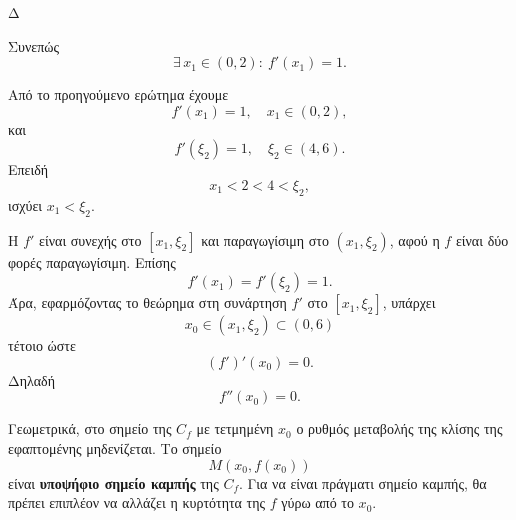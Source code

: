 \begin{thema}{Δ}
\begin{erwthma}
Συνεπώς
\[
{\exists\,x_1\in(0,2):\ f'(x_1)=1}.
\]

\item Από το προηγούμενο ερώτημα έχουμε
\[
f'(x_1)=1,\quad x_1\in(0,2),
\]
και
\[
f'(\xi_2)=1,\quad \xi_2\in(4,6).
\]
Επειδή
\[
x_1<2<4<\xi_2,
\]
ισχύει $x_1<\xi_2$.

Η $f'$ είναι συνεχής στο $[x_1,\xi_2]$ και παραγωγίσιμη στο
$(x_1,\xi_2)$, αφού η $f$ είναι δύο φορές παραγωγίσιμη. Επίσης
\[
f'(x_1)=f'(\xi_2)=1.
\]
Άρα, εφαρμόζοντας το θεώρημα  στη συνάρτηση $f'$ στο
$[x_1,\xi_2]$, υπάρχει
\[
x_0\in(x_1,\xi_2)\subset(0,6)
\]
τέτοιο ώστε
\[
(f')'(x_0)=0.
\]
Δηλαδή
\[
{f''(x_0)=0}.
\]

Γεωμετρικά, στο σημείο της $C_f$ με τετμημένη $x_0$ ο ρυθμός μεταβολής
της κλίσης της εφαπτομένης μηδενίζεται. Το σημείο
\[
M(x_0,f(x_0))
\]
είναι \textbf{υποψήφιο σημείο καμπής} της $C_f$. Για να είναι πράγματι
σημείο καμπής, θα πρέπει επιπλέον να αλλάζει η κυρτότητα της $f$ γύρω
από το $x_0$.
\end{erwthma}
\end{thema}


